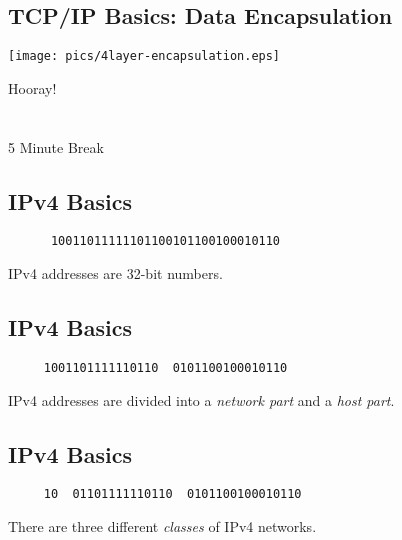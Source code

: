 \documentclass[xga]{xdvislides}
\begin{document}
\subsection{TCP/IP Basics: Data Encapsulation}
\vspace*{\fill}
\begin{center}
	\texttt{[image: pics/4layer-encapsulation.eps]}
\end{center}
\vspace*{\fill}


\newpage
\vspace*{\fill}
\begin{center}
    \Hugesize
        Hooray! \\ [1em]
    \hspace*{5mm}
    \blueline\\
    \hspace*{5mm}\\
        5 Minute Break
\end{center}
\vspace*{\fill}

\subsection{IPv4 Basics}
\vspace{.5in}
\Hugesize
\begin{center}
\begin{verbatim}
      10011011111101100101100100010110
\end{verbatim}
\vspace{.5in}
IPv4 addresses are 32-bit numbers.
\end{center}
\Normalsize

\subsection{IPv4 Basics}
\vspace{.5in}
\Hugesize
\begin{center}
\begin{verbatim}
     1001101111110110  0101100100010110
\end{verbatim}
\vspace{.5in}
IPv4 addresses are divided into a {\em network part} and a {\em host part}.
\end{center}
\Normalsize

\subsection{IPv4 Basics}
\vspace{.5in}
\Hugesize
\begin{center}
\begin{verbatim}
     10  01101111110110  0101100100010110
\end{verbatim}
\vspace{.5in}
There are three different {\em classes} of IPv4 networks.
\end{center}
\Normalsize
\end{document}
